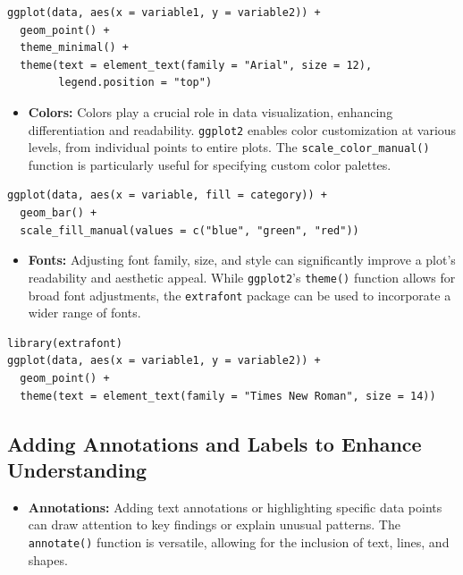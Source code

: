 \documentclass[
]{book}
\providecommand{\tightlist}{%
  \setlength{\itemsep}{0pt}\setlength{\parskip}{0pt}}
\begin{document}
\begin{verbatim}
ggplot(data, aes(x = variable1, y = variable2)) + 
  geom_point() +
  theme_minimal() +
  theme(text = element_text(family = "Arial", size = 12),
        legend.position = "top")
\end{verbatim}

\begin{itemize}
\tightlist
\item
  \textbf{Colors:} Colors play a crucial role in data visualization, enhancing differentiation and readability. \texttt{ggplot2} enables color customization at various levels, from individual points to entire plots. The \texttt{scale\_color\_manual()} function is particularly useful for specifying custom color palettes.
\end{itemize}

\begin{verbatim}
ggplot(data, aes(x = variable, fill = category)) + 
  geom_bar() +
  scale_fill_manual(values = c("blue", "green", "red"))
\end{verbatim}

\begin{itemize}
\tightlist
\item
  \textbf{Fonts:} Adjusting font family, size, and style can significantly improve a plot's readability and aesthetic appeal. While \texttt{ggplot2}'s \texttt{theme()} function allows for broad font adjustments, the \texttt{extrafont} package can be used to incorporate a wider range of fonts.
\end{itemize}

\begin{verbatim}
library(extrafont)
ggplot(data, aes(x = variable1, y = variable2)) + 
  geom_point() +
  theme(text = element_text(family = "Times New Roman", size = 14))
\end{verbatim}

\subsection{Adding Annotations and Labels to Enhance Understanding}\label{adding-annotations-and-labels-to-enhance-understanding}

\begin{itemize}
\tightlist
\item
  \textbf{Annotations:} Adding text annotations or highlighting specific data points can draw attention to key findings or explain unusual patterns. The \texttt{annotate()} function is versatile, allowing for the inclusion of text, lines, and shapes.
\end{itemize}
\end{document}

